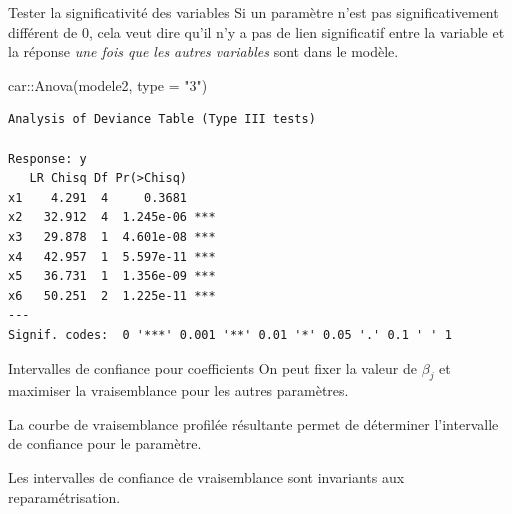 \documentclass[
  ignorenonframetext,
]{beamer}
\newenvironment{Shaded}{\begin{snugshade}}{\end{snugshade}}
\newcommand{\AttributeTok}[1]{\textcolor[rgb]{0.40,0.45,0.13}{#1}}
\newcommand{\FunctionTok}[1]{\textcolor[rgb]{0.28,0.35,0.67}{#1}}
\newcommand{\NormalTok}[1]{\textcolor[rgb]{0.00,0.23,0.31}{#1}}
\newcommand{\SpecialCharTok}[1]{\textcolor[rgb]{0.37,0.37,0.37}{#1}}
\newcommand{\StringTok}[1]{\textcolor[rgb]{0.13,0.47,0.30}{#1}}
\begin{document}
\begin{frame}[fragile]{Tester la significativité des variables}
\protect\hypertarget{tester-la-significativituxe9-des-variables}{}
Si un paramètre n'est pas significativement différent de 0, cela veut
dire qu'il n'y a pas de lien significatif entre la variable et la
réponse \emph{une fois que les autres variables} sont dans le modèle.

\footnotesize

\begin{Shaded}
\begin{Highlighting}[numbers=left,,]
\NormalTok{car}\SpecialCharTok{::}\FunctionTok{Anova}\NormalTok{(modele2, }\AttributeTok{type =} \StringTok{"3"}\NormalTok{)}
\end{Highlighting}
\end{Shaded}

\begin{verbatim}
Analysis of Deviance Table (Type III tests)

Response: y
   LR Chisq Df Pr(>Chisq)    
x1    4.291  4     0.3681    
x2   32.912  4  1.245e-06 ***
x3   29.878  1  4.601e-08 ***
x4   42.957  1  5.597e-11 ***
x5   36.731  1  1.356e-09 ***
x6   50.251  2  1.225e-11 ***
---
Signif. codes:  0 '***' 0.001 '**' 0.01 '*' 0.05 '.' 0.1 ' ' 1
\end{verbatim}

\normalsize
\end{frame}

\begin{frame}{Intervalles de confiance pour coefficients}
\protect\hypertarget{intervalles-de-confiance-pour-coefficients}{}
On peut fixer la valeur de \(\beta_j\) et maximiser la vraisemblance
pour les autres paramètres.

La courbe de vraisemblance profilée résultante permet de déterminer
l'intervalle de confiance pour le paramètre.

Les intervalles de confiance de vraisemblance sont invariants aux
reparamétrisation.
\end{frame}
\end{document}
